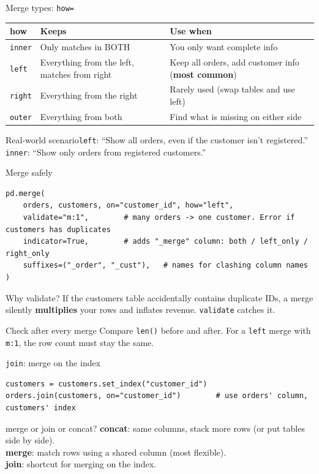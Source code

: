 \documentclass[aspectratio=169,10pt]{beamer}
\newcommand{\code}[1]{\texttt{#1}}
\newcommand{\scenario}[1]{\begin{exampleblock}{Real-world scenario}#1\end{exampleblock}}
\begin{document}
\begin{frame}{Merge types: \texttt{how=}}
  \renewcommand{\arraystretch}{1.3}
  \begin{center}
  \small
  \begin{tabular}{p{1.8cm}p{4.5cm}p{4.8cm}}
    \toprule
    \textbf{how} & \textbf{Keeps} & \textbf{Use when}\\
    \midrule
    \code{inner} & Only matches in BOTH & You only want complete info\\
    \code{left} & Everything from the left, matches from right & Keep all orders, add customer info
      (\textbf{most common})\\
    \code{right} & Everything from the right & Rarely used (swap tables and use left)\\
    \code{outer} & Everything from both & Find what is missing on either side\\
    \bottomrule
  \end{tabular}
  \end{center}
  \scenario{\code{left}: ``Show all orders, even if the customer isn't registered.''
  \code{inner}: ``Show only orders from registered customers.''}
\end{frame}

\begin{frame}[fragile]{Merge safely}
\begin{lstlisting}
pd.merge(
    orders, customers, on="customer_id", how="left",
    validate="m:1",        # many orders -> one customer. Error if customers has duplicates
    indicator=True,        # adds "_merge" column: both / left_only / right_only
    suffixes=("_order", "_cust"),   # names for clashing column names
)
\end{lstlisting}
  \begin{alertblock}{Why validate?}
    If the customers table accidentally contains duplicate IDs, a merge silently
    \textbf{multiplies} your rows and inflates revenue. \code{validate} catches it.
  \end{alertblock}
  \begin{block}{Check after every merge}
    Compare \code{len()} before and after. For a \code{left} merge with \code{m:1}, the row
    count must stay the same.
  \end{block}
\end{frame}

\begin{frame}[fragile]{\texttt{join}: merge on the index}
\begin{lstlisting}
customers = customers.set_index("customer_id")
orders.join(customers, on="customer_id")        # use orders' column, customers' index
\end{lstlisting}
  \begin{block}{merge or join or concat?}
    \textbf{concat}: same columns, stack more rows (or put tables side by side).\\
    \textbf{merge}: match rows using a shared column (most flexible).\\
    \textbf{join}: shortcut for merging on the index.
  \end{block}
\end{frame}
\end{document}
